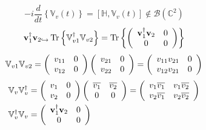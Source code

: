 \documentclass[aps,preprint]{revtex4}%
\begin{document}
\begin{equation}
-i\frac{d}{dt}\left\{  \mathbb{V}_{v}\left(  t\right)  \right\}  =\left[
\mathbb{H},\mathbb{V}_{v}\left(  t\right)  \right]  \notin\mathcal{B}\left(
\mathbb{C}^{2}\right)
\end{equation}%
\begin{equation}
\mathbf{v}_{1}^{\dagger}\mathbf{v}_{2\hookrightarrow}\operatorname{Tr}\left\{
\mathbb{V}_{v1}^{\dagger}\mathbb{V}_{v2}\right\}  =\operatorname{Tr}\left\{
\left(
\begin{array}
[c]{cc}%
\mathbf{v}_{1}^{\dagger}\mathbf{v}_{2} & 0\\
0 & 0
\end{array}
\right)  \right\}
\end{equation}%
\begin{equation}
\mathbb{V}_{v1}\mathbb{V}_{v2}=\left(
\begin{array}
[c]{cc}%
v_{11} & 0\\
v_{12} & 0
\end{array}
\right)  \left(
\begin{array}
[c]{cc}%
v_{21} & 0\\
v_{22} & 0
\end{array}
\right)  =\left(
\begin{array}
[c]{cc}%
v_{11}v_{21} & 0\\
v_{12}v_{21} & 0
\end{array}
\right)
\end{equation}%
\begin{align}
\mathbb{V}_{v}\mathbb{V}_{v}^{\dagger}  & =\left(
\begin{array}
[c]{cc}%
v_{1} & 0\\
v_{2} & 0
\end{array}
\right)  \left(
\begin{array}
[c]{cc}%
\overline{v_{1}} & \overline{v_{2}}\\
0 & 0
\end{array}
\right)  =\left(
\begin{array}
[c]{cc}%
v_{1}\overline{v_{1}} & v_{1}\overline{v_{2}}\\
v_{2}\overline{v_{1}} & v_{2}\overline{v_{2}}%
\end{array}
\right)  \\
\mathbb{V}_{v}^{\dagger}\mathbb{V}_{v}  & =\left(
\begin{array}
[c]{cc}%
\mathbf{v}_{1}^{\dagger}\mathbf{v}_{2} & 0\\
0 & 0
\end{array}
\right)
\end{align}
\end{document}
